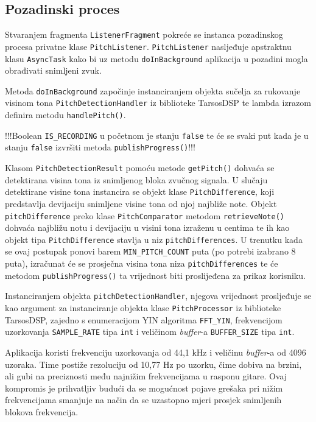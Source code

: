 \documentclass[times, utf8, zavrsni, numeric]{fer}
\begin{document}
\subsection{Pozadinski proces}
Stvaranjem fragmenta \verb|ListenerFragment| pokreće se instanca pozadinskog procesa privatne klase \verb|PitchListener|. \verb|PitchListener| nasljeđuje apstraktnu klasu \verb|AsyncTask| kako bi uz metodu \verb|doInBackground| aplikacija u pozadini mogla obrađivati snimljeni zvuk.

Metoda \verb|doInBackground| započinje instanciranjem objekta sučelja za rukovanje visinom tona \verb|PitchDetectionHandler| iz biblioteke TarsosDSP te lambda izrazom definira metodu \verb|handlePitch()|. 

!!!Boolean \verb|IS_RECORDING| u početnom je stanju \verb|false| te će se svaki put kada je u stanju \verb|false| izvršiti metoda \verb|publishProgress()|!!!

Klasom \verb|PitchDetectionResult| pomoću metode \verb|getPitch()| dohvaća se detektirana visina tona iz snimljenog bloka zvučnog signala. U slučaju detektirane visine tona instancira se objekt klase \verb|PitchDifference|, koji predstavlja devijaciju snimljene visine tona od njoj najbliže note. Objekt \verb|pitchDifference| preko klase \verb|PitchComparator| metodom \verb|retrieveNote()| dohvaća najbližu notu i devijaciju u visini tona izraženu u centima te ih kao objekt tipa \verb|PitchDifference| stavlja u niz \verb|pitchDifferences|. U trenutku kada se ovaj postupak ponovi barem \verb|MIN_PITCH_COUNT| puta (po potrebi izabrano 8 puta), izračunat će se prosječna visina tona niza \verb|pitchDifferences| te će metodom \verb|publishProgress()| ta vrijednost biti proslijeđena za prikaz korisniku.

Instanciranjem objekta \verb|pitchDetectionHandler|, njegova vrijednost prosljeđuje se kao argument za instanciranje objekta klase \verb|PitchProcessor| iz biblioteke TarsosDSP, zajedno s enumeracijom YIN algoritma \verb|FFT_YIN|, frekvencijom uzorkovanja \verb|SAMPLE_RATE| tipa \verb|int| i veličinom \textit{buffer}-a \verb|BUFFER_SIZE| tipa \verb|int|. 

Aplikacija koristi frekvenciju uzorkovanja od 44,1 kHz i veličinu \textit{buffer}-a od 4096 uzoraka. Time postiže rezoluciju od 10,77 Hz po uzorku, čime dobiva na brzini, ali gubi na preciznosti među najnižim frekvencijama u rasponu gitare. Ovaj kompromis je prihvatljiv budući da se mogućnost pojave grešaka pri nižim frekvencijama smanjuje na način da se uzastopno mjeri prosjek snimljenih blokova frekvencija. 
\end{document}
